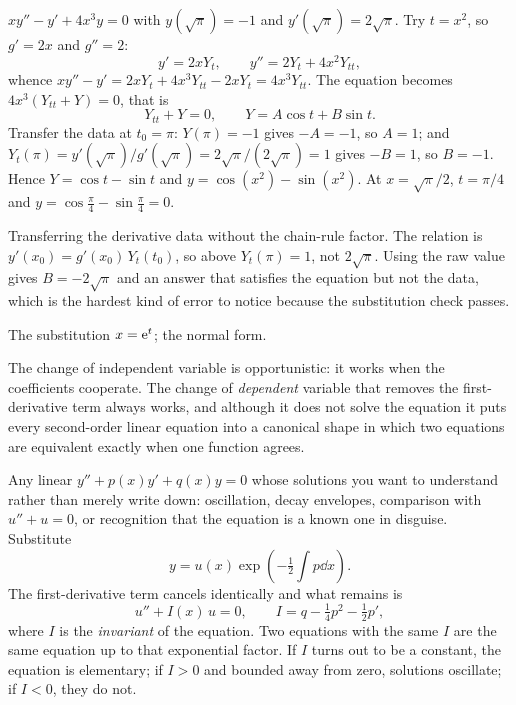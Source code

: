 \begin{worked}
$xy''-y'+4x^{3}y=0$ with $y(\sqrt{\pi})=-1$ and $y'(\sqrt{\pi})=2\sqrt{\pi}$. Try $t=x^{2}$, so $g'=2x$ and $g''=2$:
\[y'=2xY_t,\qquad y''=2Y_t+4x^{2}Y_{tt},\]
whence $xy''-y'=2xY_t+4x^{3}Y_{tt}-2xY_t=4x^{3}Y_{tt}$. The equation becomes $4x^{3}(Y_{tt}+Y)=0$, that is
\[Y_{tt}+Y=0,\qquad Y=A\cos t+B\sin t.\]
Transfer the data at $t_0=\pi$: $Y(\pi)=-1$ gives $-A=-1$, so $A=1$; and $Y_t(\pi)=y'(\sqrt{\pi})/g'(\sqrt{\pi})=2\sqrt{\pi}/(2\sqrt{\pi})=1$ gives $-B=1$, so $B=-1$. Hence $Y=\cos t-\sin t$ and $y=\cos(x^{2})-\sin(x^{2})$. At $x=\sqrt{\pi}/2$, $t=\pi/4$ and $y=\cos\tfrac{\pi}{4}-\sin\tfrac{\pi}{4}=0$.
\end{worked}

\begin{trap}
Transferring the derivative data without the chain-rule factor. The relation is $y'(x_0)=g'(x_0)\,Y_t(t_0)$, so above $Y_t(\pi)=1$, not $2\sqrt{\pi}$. Using the raw value gives $B=-2\sqrt{\pi}$ and an answer that satisfies the equation but not the data, which is the hardest kind of error to notice because the substitution check passes.
\end{trap}

\begin{seealsob}The substitution $x=\mathrm{e}^{t}$; the normal form.\end{seealsob}

The change of independent variable is opportunistic: it works when the coefficients cooperate. The change of \emph{dependent} variable that removes the first-derivative term always works, and although it does not solve the equation it puts every second-order linear equation into a canonical shape in which two equations are equivalent exactly when one function agrees.

\cue Any linear $y''+p(x)y'+q(x)y=0$ whose solutions you want to understand rather than merely write down: oscillation, decay envelopes, comparison with $u''+u=0$, or recognition that the equation is a known one in disguise.
\method Substitute
\[y=u(x)\exp\!\left(-\tfrac12\int p\dd x\right).\]
The first-derivative term cancels identically and what remains is
\[u''+I(x)\,u=0,\qquad I=q-\tfrac14p^{2}-\tfrac12p',\]
where $I$ is the \emph{invariant} of the equation. Two equations with the same $I$ are the same equation up to that exponential factor. If $I$ turns out to be a constant, the equation is elementary; if $I>0$ and bounded away from zero, solutions oscillate; if $I<0$, they do not.

